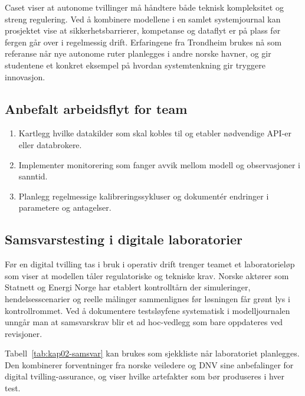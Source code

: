 Caset viser at autonome tvillinger må håndtere både teknisk kompleksitet og streng regulering. Ved å kombinere modellene i en
samlet systemjournal kan prosjektet vise at sikkerhetsbarrierer, kompetanse og dataflyt er på plass før fergen går over i
regelmessig drift. Erfaringene fra Trondheim brukes nå som referanse når nye autonome ruter planlegges i andre norske havner,
og gir studentene et konkret eksempel på hvordan systemtenkning gir tryggere innovasjon.

\subsection{Anbefalt arbeidsflyt for team}
\begin{enumerate}
    \item Kartlegg hvilke datakilder som skal kobles til og etabler nødvendige API-er eller databrokere.
    \item Implementer monitorering som fanger avvik mellom modell og observasjoner i sanntid.
    \item Planlegg regelmessige kalibreringssykluser og dokumentér endringer i parametere og antagelser.
\end{enumerate}

\subsection{Samsvarstesting i digitale laboratorier}
Før en digital tvilling tas i bruk i operativ drift trenger teamet et laboratorieløp som viser at modellen tåler regulatoriske og
tekniske krav. Norske aktører som Statnett og Energi Norge har etablert kontrolltårn der simuleringer, hendelsesscenarier og
reelle målinger sammenlignes før løsningen får grønt lys i kontrollrommet.\citep{statnett2024kontrolltarn,energinorge2023beredskap}
Ved å dokumentere testsløyfene systematisk i modelljournalen unngår man at samsvarskrav blir et ad hoc-vedlegg som bare
oppdateres ved revisjoner.

Tabell~\ref{tab:kap02-samsvar} kan brukes som sjekkliste når laboratoriet planlegges. Den kombinerer forventninger fra norske
veiledere og DNV sine anbefalinger for digital tvilling-assurance, og viser hvilke artefakter som bør produseres i hver test.
\citep{sintef2021digital,dnv2023digitalassurance}

